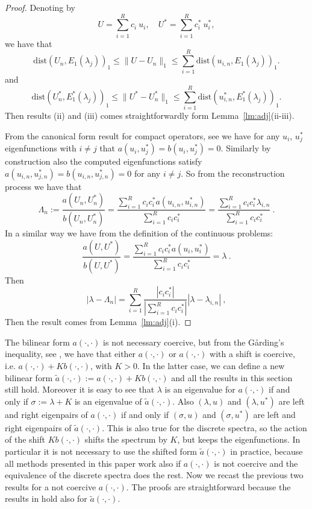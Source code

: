 \documentclass[smallextended]{svjour3}
\begin{document}
\begin{proof}
Denoting by 
$$
U=\sum_{i=1}^{R} c_i \ u_{i},\quad U^*=\sum_{i=1}^{R} c_i^* \ u_{i}^*,
$$
we have that
$$
\mathrm{dist}(
U_n,E_1(\lambda_j))_{1}\leq \|U-U_n\|_{1}\leq \sum_{i=1}^{R} \mathrm{dist}(
u_{i,n},E_1(\lambda_j))_{1}.
$$
and
$$
\mathrm{dist}(
U_n^*,E_1^*(\lambda_j))_{1}\leq \|U^*-U_n^*\|_{1}\leq \sum_{i=1}^{R} \mathrm{dist}(
u_{i,n}^*,E_1^*(\lambda_j))_{1}.
$$
Then results (ii) and (iii) comes straightforwardly form Lemma~\ref{lm:adj}(ii-iii).


From the canonical form result for compact operators, see \cite[Theorem~9.17]{Hislop} we have for any $u_i$, $u_j^*$ eigenfunctions with $i\neq j$ that $a(u_i,u_j^*)=b(u_i,u_j^*)=0$.
Similarly by construction also the computed eigenfunctions satisfy $a(u_{i,n},u_{j,n}^*)=b(u_{i,n},u_{j,n}^*)=0$ for any $i\neq j$.
So from the reconstruction process we have that
$$
\Lambda_n:=\frac{a(U_n,U_n^*)}{b(U_n,U_n^*)}=\frac{\sum_{i=1}^{R} c_ic_i^*a(u_{i,n},u_{i,n}^*)}{\sum_{i=1}^{R} c_ic_i^*}
=\frac{\sum_{i=1}^{R} c_ic_i^*\lambda_{i,n}}{\sum_{i=1}^{R} c_ic_i^*}\ .
$$
In a similar way we have from the definition of the continuous problems:
$$
\frac{a(U,U^*)}{b(U,U^*)}=\frac{\sum_{i=1}^{R} c_ic_i^*a(u_{i},u_{i}^*)}{\sum_{i=1}^{R} c_ic_i^*}=\lambda\ .
$$
Then
$$
|\lambda-\Lambda_n|=\sum_{i=1}^{R}\frac{|c_ic_i^*|}{|\sum_{i=1}^{R} c_ic_i^*|}|\lambda-\lambda_{i,n}| \ ,
$$
Then the result comes from Lemma~\ref{lm:adj}(i).



\end{proof}

The bilinear form $a(\cdot,\cdot)$ is not necessary coercive, but from the G\r{a}rding's inequality, see \cite[Theorem~(5.6.8)]{Brenner}, we have that either $a(\cdot,\cdot)$ or $a(\cdot,\cdot)$ with a shift is coercive, i.e. $a(\cdot,\cdot)+K b(\cdot,\cdot)$, with $K>0$. In the latter case, we can define a new bilinear form $\tilde a(\cdot,\cdot):=a(\cdot,\cdot)+K b(\cdot,\cdot)$ and all the results in this section still hold. Moreover it is easy to see that $\lambda$ is an eigenvalue for $a(\cdot,\cdot)$ if and only if $\sigma:=\lambda+K$ is an eigenvalue of $\tilde  a(\cdot,\cdot)$. Also $(\lambda,u)$ and $(\lambda,u^*)$ are left and right eigenpairs of $a(\cdot,\cdot)$ if and only if $(\sigma,u)$ and $(\sigma,u^*)$ are left and right eigenpairs of $\tilde  a(\cdot,\cdot)$. This is also true for the discrete spectra, so the action of the shift $K b(\cdot,\cdot)$ shifts the spectrum by $K$, but keeps the eigenfunctions. In particular it is not necessary to use the shifted form $\tilde a(\cdot,\cdot)$ in practice, because all methods presented in this paper work also if $a(\cdot,\cdot)$ is not coercive and the equivalence of the discrete spectra does the rest. Now we recast the previous two results for a not coercive  $a(\cdot,\cdot)$. The proofs are straightforward because the results in \cite{babuska} hold also for $\tilde a(\cdot,\cdot)$.
\end{document}
